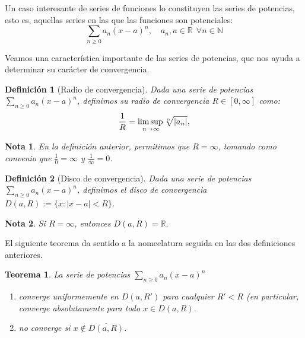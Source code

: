 \documentclass[11pt, a4paper]{article}
\newif\IfInSansMode
\theoremstyle{theorem-style}
\newtheorem{nth}{Teorema}[section]
\theoremstyle{definition-style}
\newtheorem{ndef}{Definición}[section]
\theoremstyle{remark-style}
\newtheorem*{nota}{Nota}
\theoremstyle{example-style}
\newenvironment{nlist}
{\begin{enumerate}
    \renewcommand\labelenumi{(\emph{\roman{enumi})}}}
  {\end{enumerate}}
\begin{document}
Un caso interesante de series de funciones lo constituyen las series de potencias, esto es, aquellas series en las que las funciones son potenciales: $$\sum_{n \ge 0} a_n(x-a)^n, \quad a_n, a \in \mathbb{R} \ \ \forall n \in \mathbb{N}$$

Veamos una característica importante de las series de potencias, que nos ayuda a determinar su carácter de convergencia.

\begin{ndef}[Radio de convergencia] Dada una serie de potencias $\sum_{n \ge 0} a_n(x-a)^n$, definimos su radio de convergencia $R \in [0, \infty]$ como: $$
  \frac{1}{R} =\underset{n\to\infty}{\mbox{lim\,sup\,}}  \sqrt[n]{|a_n|},$$
\end{ndef}

\begin{nota}
  En la definición anterior, permitimos que $R = \infty$, tomando como convenio que $\frac{1}{0} = \infty$ y $\frac{1}{\infty} = 0$.
\end{nota}

\begin{ndef}[Disco de convergencia] Dada una serie de potencias $\sum_{n \ge 0} a_n(x-a)^n$, definimos el disco de convergencia $D(a,R) := \{ x : |x-a| < R\}$. 
\end{ndef}

\begin{nota}
  Si $R = \infty$, entonces $D(a,R) = \mathbb{R}$.
\end{nota}

El siguiente teorema da sentido a la nomeclatura seguida en las dos definiciones anteriores.

\begin{nth} \label{13}
  La serie de potencias $\displaystyle\sum_{n\geq 0} a_n (x-a)^n$  
  \begin{nlist}
  \item converge uniformemente en $D(a,R')$ para cualquier $R'<R$ (en particular, converge absolutamente para todo $x\in D(a,R)$.
  \item no converge si $x\not\in \overline{D(a,R)}$.
  \end{nlist}
\end{nth}
\end{document}
